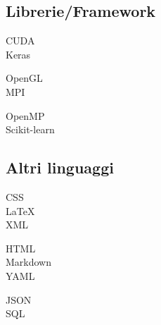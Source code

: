 \documentclass[curriculum-vitae-ita]{subfiles}
\begin{document}
		\subsection*{Librerie/Framework}
			\begin{minipage}[t]{.3\textwidth}
				CUDA \hfill {}\\
				Keras \hfill {}\\  %
			\end{minipage}
			\hfill
			\begin{minipage}[t]{.3\textwidth}
				OpenGL \hfill {}\\
				MPI \hfill {}\\  %
			\end{minipage}
			\hfill
			\begin{minipage}[t]{.3\textwidth}
				OpenMP \hfill {}\\
				Scikit-learn \hfill {}\\  %
			\end{minipage}
		
		\subsection*{Altri linguaggi}
			\begin{minipage}[t]{.3\textwidth}
				CSS \hfill {}\\
				\LaTeX \hfill {}\\
				XML \hfill {}\\ %
			\end{minipage}
			\hfill
			\begin{minipage}[t]{.3\textwidth}
				HTML \hfill {}\\
				Markdown \hfill {}\\
				YAML \hfill {}\\ %
			\end{minipage}
			\hfill
			\begin{minipage}[t]{.3\textwidth}
				JSON \hfill {}\\
				SQL \hfill {}\\ %
			\end{minipage}
		
\end{document}
